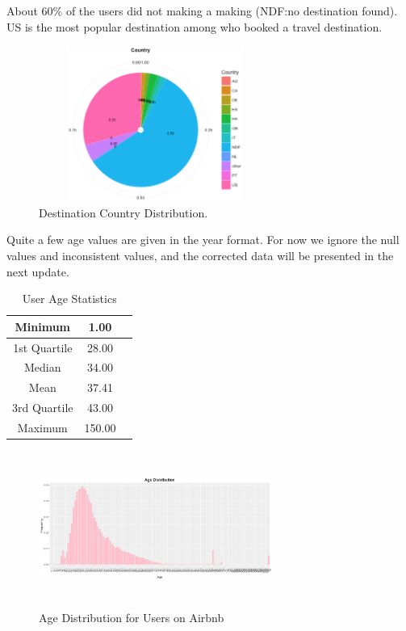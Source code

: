 \documentclass{sig-alternate-05-2015}
\begin{document}
About 60\% of the users did not making a making (NDF:no destination found). US is the most popular destination among who booked a travel destination.

\begin{figure}
\centering
\includegraphics[height=2in, width=3in]{1}
\caption{Destination Country Distribution.}
\end{figure}

Quite a few age values are given in the year format. For now we ignore the null values and inconsistent values, and the corrected data will be presented in the next update.

\begin{table}
\centering
\caption{User Age Statistics}
\begin{tabular}{|c|c|l|} \hline
Minimum & 1.00\\ \hline
1st Quartile & 28.00 \\ \hline
Median & 34.00 \\ \hline
Mean & 37.41 \\ \hline
3rd Quartile & 43.00 \\ \hline
Maximum & 150.00 \\
\hline\end{tabular}
\end{table}

\begin{figure}
\centering
\includegraphics[height=2in, width=3in]{2}
\caption{Age Distribution for Users on Airbnb}
\end{figure}
\end{document}
